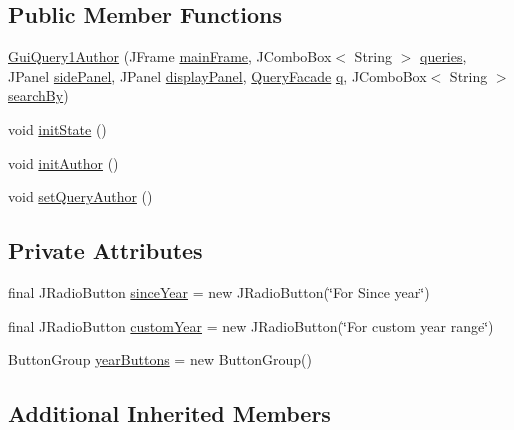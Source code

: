 \subsection*{Public Member Functions}
\begin{DoxyCompactItemize}
\item 
\hyperlink{classGuiQuery1Author_a7c4bd2b044d83f7a547ac78dcb29c914}{Gui\+Query1\+Author} (J\+Frame \hyperlink{classGUIQuery_aba988b5bec899d53480a472de7b87dfa}{main\+Frame}, J\+Combo\+Box$<$ String $>$ \hyperlink{classGUIQuery_a0db8bd960b4512cadf9aa40642934680}{queries}, J\+Panel \hyperlink{classGUIQuery_a70e233b1f14874166b7707edebe825d2}{side\+Panel}, J\+Panel \hyperlink{classGUIQuery_a8b4dbf257e0859c597591f072349b75c}{display\+Panel}, \hyperlink{classQueryFacade}{Query\+Facade} \hyperlink{classGUIQuery_a2a20445d749185552014142b78f3e071}{q}, J\+Combo\+Box$<$ String $>$ \hyperlink{classGuiQuery1_a021ae2f4fa2ec342496af6ac434995f4}{search\+By})
\item 
void \hyperlink{classGuiQuery1Author_ad86a9ba6fd82a330911b7267c25e7afe}{init\+State} ()
\item 
void \hyperlink{classGuiQuery1Author_a823956ef2ee980e1f907a55c2fc6f0b8}{init\+Author} ()
\item 
void \hyperlink{classGuiQuery1Author_a0bf8cce7ac52411d08c756b443be7b74}{set\+Query\+Author} ()
\end{DoxyCompactItemize}
\subsection*{Private Attributes}
\begin{DoxyCompactItemize}
\item 
final J\+Radio\+Button \hyperlink{classGuiQuery1Author_a5f63c8ecd9f332aadcbb7ec4c68dae30}{since\+Year} = new J\+Radio\+Button(\char`\"{}For Since year\char`\"{})
\item 
final J\+Radio\+Button \hyperlink{classGuiQuery1Author_a0ace1bd452a0f78fdda026280b168781}{custom\+Year} = new J\+Radio\+Button(\char`\"{}For custom year range\char`\"{})
\item 
Button\+Group \hyperlink{classGuiQuery1Author_a67b9d26988f566d493d8599a909d71e6}{year\+Buttons} = new Button\+Group()
\end{DoxyCompactItemize}
\subsection*{Additional Inherited Members}


